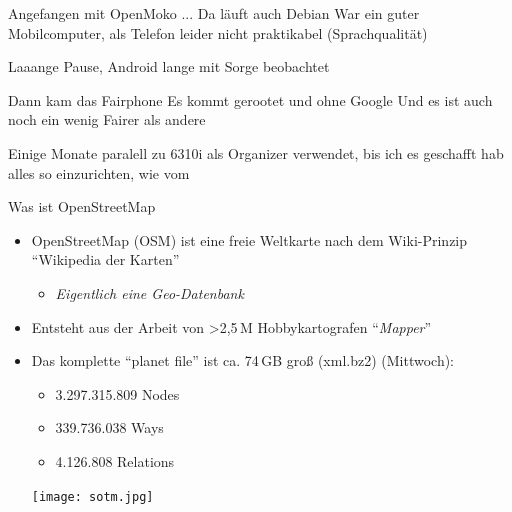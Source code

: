 \documentclass{beamer}
\begin{document}
Angefangen mit OpenMoko ... Da läuft auch Debian
  War ein guter Mobilcomputer, als Telefon leider nicht praktikabel (Sprachqualität)

Laaange Pause, Android lange mit Sorge beobachtet

Dann kam das Fairphone
  Es kommt gerootet und ohne Google
  Und es ist auch noch ein wenig Fairer als andere

Einige Monate paralell zu 6310i als Organizer verwendet, bis ich es geschafft hab alles so einzurichten, wie vom 




\begin{frame}{Was ist OpenStreetMap}

\begin{itemize}
  \item OpenStreetMap (OSM) ist eine freie Weltkarte nach dem Wiki-Prinzip "`Wikipedia der Karten"'
    \begin{itemize}
      \item \emph{Eigentlich eine Geo-Datenbank}
    \end{itemize}
\pause
  \item Entsteht aus der Arbeit von \textgreater 2,5\,M Hobbykartografen "`\emph{Mapper}"'

 \item Das komplette "`planet file"' ist ca. 74\,GB groß (xml.bz2) (Mittwoch):
  \begin{itemize}
    \item 3.297.315.809 Nodes
    \item 339.736.038 Ways
    \item 4.126.808 Relations
  \end{itemize}

 \begin{center}
 \texttt{[image: sotm.jpg]}
 \end{center}

\end{itemize}

\end{frame}
\end{document}
